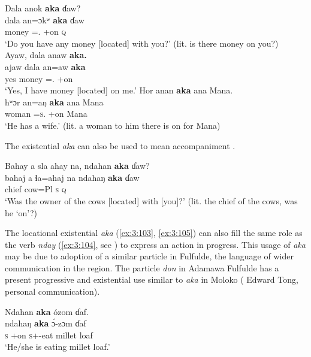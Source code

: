 \ea \label{ex:3:100}
\ea Dala  anok \textbf{aka}  ɗaw? \\
\gll  dala   an=ɔkʷ     \textbf{aka}     ɗaw  \\
      money  {\DAT}={\twoS}.{\IO}  {\EXT}+on    {\textsc{q}}  \\
\glt  ‘Do you have any money [located] with you?’ (lit. is there money on you?)\\

\medskip
\ex
   Ayaw,  dala  anaw  \textbf{aka.}\\
\gll ajaw  dala   an=aw   \textbf{aka}\\
   yes  money  {\DAT}={\oneS}.{\IO}  {\EXT}+on\\
\glt ‘Yes, I have money [located] on me.’ 
\z\z
\clearpage
\ea \label{ex:3:101}
Hor  anan  \textbf{aka} ana  Mana.\\
\gll  hʷɔr   an=aŋ     \textbf{aka} ana   Mana\\
      woman  {\DAT}=\textsc{s}.{\IO}  {\EXT}+on    {\DAT} Mana\\
\glt  ‘He has a wife.’ (lit. a woman to him there is on for Mana)
\z

The existential \textit{aka} can also be used to mean accompaniment .

\ea \label{ex:3:102}
 Bahay  a  sla  ahay  na,  ndahan  \textbf{aka}  ɗaw?\\
\gll  bahaj  a  ɬa=ahaj  na  ndahaŋ  \textbf{aka}  ɗaw\\
      chief  {\GEN}  cow=Pl  {\PSP}  \textsc{s}  {\EXT}  {\textsc{q}}\\
\glt  ‘Was the owner of the cows [located] with [you]?' (lit. the chief of the cows, was he ‘on’?)
\z

The locational existential \textit{aka}  (\ref{ex:3:103}, \ref{ex:3:105}) can also fill the same role as the verb \textit{nday} (\ref{ex:3:104}, see ) to express an action in progress. This usage of \textit{aka} may be due to adoption of a similar particle in Fulfulde, the language of wider communication in the region. The particle \textit{don} in Adamawa Fulfulde has a present progressive and existential use similar to \textit{aka} in Moloko (%
Edward Tong, personal communication).

\ea \label{ex:3:103}
Ndahan \textbf{aka} ózom ɗaf.\\
\gll  ndahaŋ   \textbf{aka}     \'{ɔ}-zɔm     ɗaf\\
      \textsc{s}    {\EXT}+on    \textsc{s}+{\IFV}-eat  {millet loaf}\\
\glt  ‘He/she is eating millet loaf.’
\z

